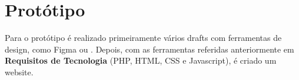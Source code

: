 \documentclass{scrreprt}
\begin{document}
\section{Protótipo}

Para o protótipo é realizado primeiramente vários drafts com
ferramentas de design, como Figma ou . Depois, com as ferramentas
referidas anteriormente em \textbf{Requisitos de Tecnologia} (PHP,
HTML, CSS e Javascript), é criado um website.



\end{document}
